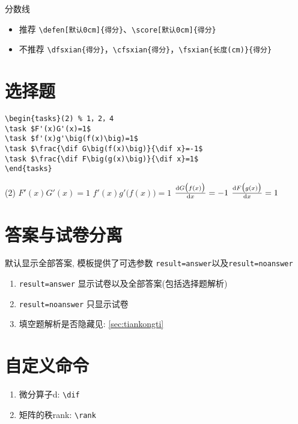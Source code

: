 \documentclass[11pt,twoside]{article}
\begin{document}
\vspace{1.5em}
\noindent 分数线
\begin{itemize}
\item 推荐 \lstinline[style=iltx]|\defen[默认0cm]{得分}|、\lstinline[style=iltx]|\score[默认0cm]{得分}|
\item 不推荐 \lstinline[style=iltx]|\dfsxian{得分}|，\lstinline[style=iltx]|\cfsxian{得分}|，\lstinline[style=iltx]|\fsxian{长度(cm)}{得分}|
\end{itemize}



\section{选择题}
\begin{lstlisting}[style=tsdtex]
\begin{tasks}(2) % 1，2，4
\task $F'(x)G'(x)=1$
\task $f'(x)g'\big(f(x)\big)=1$
\task $\frac{\dif G\big(f(x)\big)}{\dif x}=-1$
\task $\frac{\dif F\big(g(x)\big)}{\dif x}=1$	
\end{tasks}
\end{lstlisting}
\begin{tasks}(2) %
\task $F'(x)G'(x)=1$
\task $f'(x)g'\big(f(x)\big)=1$
\task $\frac{\mathop{}\!\mathrm{d} G\big(f(x)\big)}{\mathop{}\!\mathrm{d} x}=-1$
\task $\frac{\mathop{}\!\mathrm{d} F\big(g(x)\big)}{\mathop{}\!\mathrm{d} x}=1$	
\end{tasks}


\section{答案与试卷分离}

默认显示全部答案, 模板提供了可选参数 \lstinline[style=iltx]|result=answer|以及\lstinline[style=iltx]|result=noanswer|
\begin{enumerate}
\item \lstinline[style=iltx]|result=answer| 显示试卷以及全部答案(包括选择题解析)
\item \lstinline[style=iltx]|result=noanswer| 只显示试卷
\item 填空题解析是否隐藏见: \ref{sec:tiankongti}
\end{enumerate}  

\section{自定义命令}
\begin{enumerate}
\item 微分算子d: \lstinline[style=iltx]|\dif|
\item 矩阵的秩rank: \lstinline[style=iltx]|\rank|
\end{enumerate}

\clearpage
\end{document}
